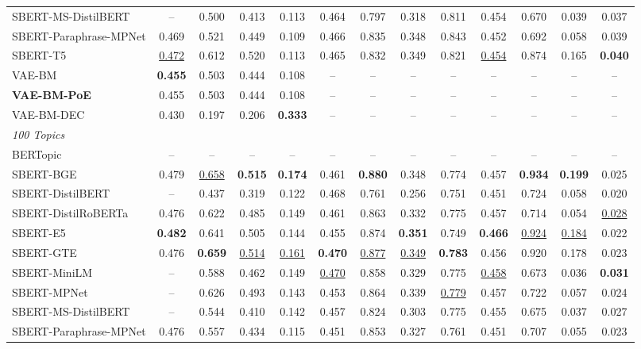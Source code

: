 \begin{table}[t]
{\begin{tabular}{lcccccccccccc}
SBERT-MS-DistilBERT & -- & 0.500 & 0.413 & 0.113 & 0.464 & 0.797 & 0.318 & 0.811 & 0.454 & 0.670 & 0.039 & 0.037 \\
SBERT-Paraphrase-MPNet & 0.469 & 0.521 & 0.449 & 0.109 & 0.466 & 0.835 & 0.348 & 0.843 & 0.452 & 0.692 & 0.058 & 0.039 \\
SBERT-T5 & \underline{0.472} & 0.612 & 0.520 & 0.113 & 0.465 & 0.832 & 0.349 & 0.821 & \underline{0.454} & 0.874 & 0.165 & \textbf{0.040} \\
\midrule
VAE-BM & \textbf{0.455} & 0.503 & 0.444 & 0.108 & -- & -- & -- & -- & -- & -- & -- & -- \\
\textbf{VAE-BM-PoE} & 0.455 & 0.503 & 0.444 & 0.108 & -- & -- & -- & -- & -- & -- & -- & -- \\
VAE-BM-DEC & 0.430 & 0.197 & 0.206 & \textbf{0.333} & -- & -- & -- & -- & -- & -- & -- & -- \\
\midrule
\multicolumn{13}{l}{\textit{100 Topics}} \\
BERTopic & -- & -- & -- & -- & -- & -- & -- & -- & -- & -- & -- & -- \\
SBERT-BGE & 0.479 & \underline{0.658} & \textbf{0.515} & \textbf{0.174} & 0.461 & \textbf{0.880} & 0.348 & 0.774 & 0.457 & \textbf{0.934} & \textbf{0.199} & 0.025 \\
SBERT-DistilBERT & -- & 0.437 & 0.319 & 0.122 & 0.468 & 0.761 & 0.256 & 0.751 & 0.451 & 0.724 & 0.058 & 0.020 \\
SBERT-DistilRoBERTa & 0.476 & 0.622 & 0.485 & 0.149 & 0.461 & 0.863 & 0.332 & 0.775 & 0.457 & 0.714 & 0.054 & \underline{0.028} \\
SBERT-E5 & \textbf{0.482} & 0.641 & 0.505 & 0.144 & 0.455 & 0.874 & \textbf{0.351} & 0.749 & \textbf{0.466} & \underline{0.924} & \underline{0.184} & 0.022 \\
SBERT-GTE & 0.476 & \textbf{0.659} & \underline{0.514} & \underline{0.161} & \textbf{0.470} & \underline{0.877} & \underline{0.349} & \textbf{0.783} & 0.456 & 0.920 & 0.178 & 0.023 \\
SBERT-MiniLM & -- & 0.588 & 0.462 & 0.149 & \underline{0.470} & 0.858 & 0.329 & 0.775 & \underline{0.458} & 0.673 & 0.036 & \textbf{0.031} \\
SBERT-MPNet & -- & 0.626 & 0.493 & 0.143 & 0.453 & 0.864 & 0.339 & \underline{0.779} & 0.457 & 0.722 & 0.057 & 0.024 \\
SBERT-MS-DistilBERT & -- & 0.544 & 0.410 & 0.142 & 0.457 & 0.824 & 0.303 & 0.775 & 0.455 & 0.675 & 0.037 & 0.027 \\
SBERT-Paraphrase-MPNet & 0.476 & 0.557 & 0.434 & 0.115 & 0.451 & 0.853 & 0.327 & 0.761 & 0.451 & 0.707 & 0.055 & 0.023 \\

\end{tabular}}
\end{table}
